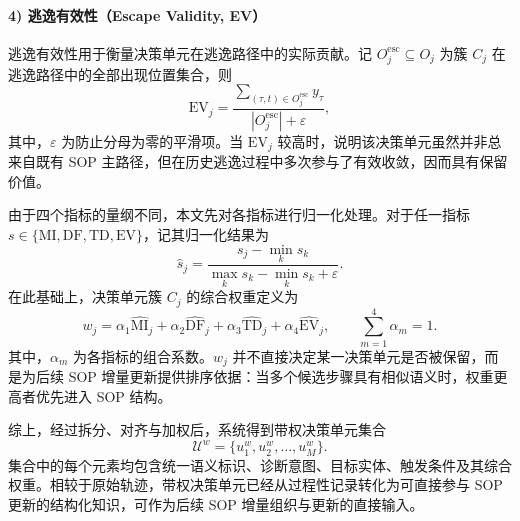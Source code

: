 \paragraph{4) 逃逸有效性（Escape Validity, EV）}
逃逸有效性用于衡量决策单元在逃逸路径中的实际贡献。记 $O_j^{\mathrm{esc}}\subseteq O_j$ 为簇 $C_j$ 在逃逸路径中的全部出现位置集合，则
\begin{equation}
\mathrm{EV}_{j}=
\frac{\sum_{(\tau,t)\in O_j^{\mathrm{esc}}} y_{\tau}}
{|O_j^{\mathrm{esc}}|+\varepsilon},
\end{equation}
其中，$\varepsilon$ 为防止分母为零的平滑项。当 $\mathrm{EV}_{j}$ 较高时，说明该决策单元虽然并非总来自既有 SOP 主路径，但在历史逃逸过程中多次参与了有效收敛，因而具有保留价值。

由于四个指标的量纲不同，本文先对各指标进行归一化处理。对于任一指标 $s\in\{\mathrm{MI},\mathrm{DF},\mathrm{TD},\mathrm{EV}\}$，记其归一化结果为
\begin{equation}
\widehat{s}_{j}=
\frac{s_{j}-\min_{k}s_{k}}
{\max_{k}s_{k}-\min_{k}s_{k}+\varepsilon}.
\end{equation}
在此基础上，决策单元簇 $C_j$ 的综合权重定义为
\begin{equation}
w_j=\alpha_{1}\widehat{\mathrm{MI}}_{j}
+\alpha_{2}\widehat{\mathrm{DF}}_{j}
+\alpha_{3}\widehat{\mathrm{TD}}_{j}
+\alpha_{4}\widehat{\mathrm{EV}}_{j},
\qquad
\sum_{m=1}^{4}\alpha_m=1.
\end{equation}
其中，$\alpha_m$ 为各指标的组合系数。$w_j$ 并不直接决定某一决策单元是否被保留，而是为后续 SOP 增量更新提供排序依据：当多个候选步骤具有相似语义时，权重更高者优先进入 SOP 结构。

综上，经过拆分、对齐与加权后，系统得到带权决策单元集合
\begin{equation}
\mathcal{U}^{w}=\{u^{w}_{1},u^{w}_{2},\ldots,u^{w}_{M}\}.
\end{equation}
集合中的每个元素均包含统一语义标识、诊断意图、目标实体、触发条件及其综合权重。相较于原始轨迹，带权决策单元已经从过程性记录转化为可直接参与 SOP 更新的结构化知识，可作为后续 SOP 增量组织与更新的直接输入。

